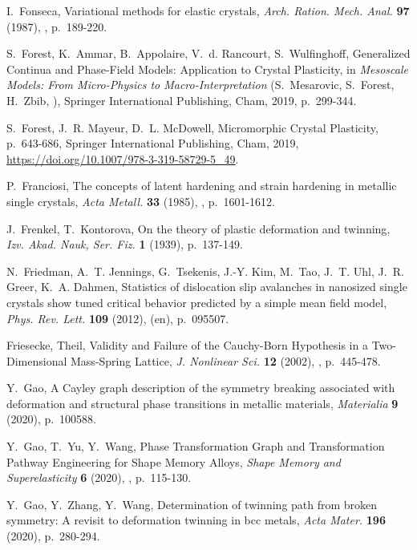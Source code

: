 \documentclass[CRPHYS,Unicode,manuscript]{cedram}
\begin{document}
\begin{thebibliography}{100}
I.~Fonseca, {\og Variational methods for elastic crystals\fg}, \emph{Arch.
  Ration. Mech. Anal.} \textbf{97} (1987), , p.~189-220.

S.~Forest, K.~Ammar, B.~Appolaire, V.~d. Rancourt, S.~Wulfinghoff, {\og
  Generalized Continua and {Phase-Field} Models: Application to Crystal
  Plasticity\fg}, in \emph{Mesoscale Models: From {Micro-Physics} to
  {Macro-Interpretation}} (S.~Mesarovic, S.~Forest, H.~Zbib, \cdredsname),
  Springer International Publishing, Cham, 2019, p.~299-344.

S.~Forest, J.~R. Mayeur, D.~L. McDowell, {\og Micromorphic Crystal
  Plasticity\fg}, p.~643-686, Springer International Publishing, Cham, 2019,
  \url{https://doi.org/10.1007/978-3-319-58729-5_49}.

P.~Franciosi, {\og The concepts of latent hardening and strain hardening in
  metallic single crystals\fg}, \emph{Acta Metall.} \textbf{33} (1985),
  , p.~1601-1612.

J.~Frenkel, T.~Kontorova, {\og On the theory of plastic deformation and
  twinning\fg}, \emph{Izv. Akad. Nauk, Ser. Fiz.} \textbf{1} (1939),
  p.~137-149.

N.~Friedman, A.~T. Jennings, G.~Tsekenis, J.-Y. Kim, M.~Tao, J.~T. Uhl, J.~R.
  Greer, K.~A. Dahmen, {\og Statistics of dislocation slip avalanches in
  nanosized single crystals show tuned critical behavior predicted by a simple
  mean field model\fg}, \emph{Phys. Rev. Lett.} \textbf{109} (2012),  (en), p.~095507.

{Friesecke}, {Theil}, {\og Validity and Failure of the {Cauchy-Born} Hypothesis
  in a {Two-Dimensional} {Mass-Spring} Lattice\fg}, \emph{J. Nonlinear Sci.}
  \textbf{12} (2002), , p.~445-478.

Y.~Gao, {\og A Cayley graph description of the symmetry breaking associated
  with deformation and structural phase transitions in metallic materials\fg},
  \emph{Materialia} \textbf{9} (2020), p.~100588.

Y.~Gao, T.~Yu, Y.~Wang, {\og Phase Transformation Graph and Transformation
  Pathway Engineering for Shape Memory Alloys\fg}, \emph{Shape Memory and
  Superelasticity} \textbf{6} (2020), , p.~115-130.

Y.~Gao, Y.~Zhang, Y.~Wang, {\og Determination of twinning path from broken
  symmetry: A revisit to deformation twinning in bcc metals\fg}, \emph{Acta
  Mater.} \textbf{196} (2020), p.~280-294.


\end{thebibliography}
\end{document}

